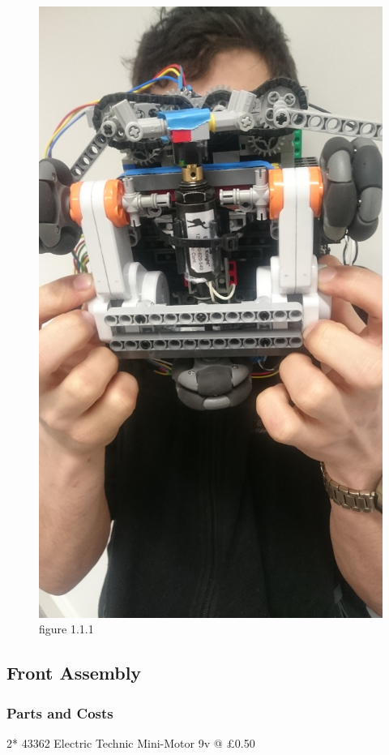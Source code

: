 \documentclass[a4paper]{article}
\begin{document}
\begin{figure}[!ht]
\caption{figure 1.1.1}
\centering
\includegraphics[width=\textwidth, angle=270]{DSC_0036.jpg}
\end{figure}

\subsection{Front Assembly}
\subsubsection{Parts and Costs}
2* 43362 Electric Technic Mini-Motor 9v @ £0.50 
\end{document}
